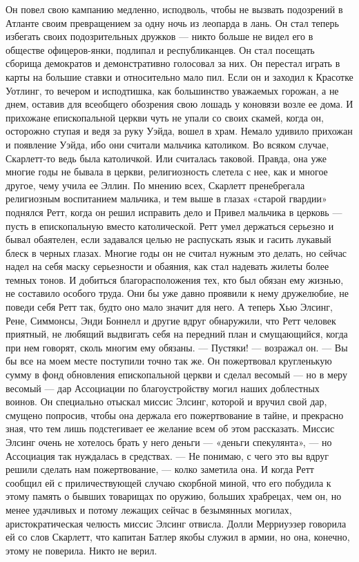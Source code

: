 Он повел свою кампанию медленно, исподволь, чтобы не вызвать подозрений в Атланте своим превращением за одну ночь из леопарда в лань. Он стал теперь избегать своих подозрительных дружков — никто больше не видел его в обществе офицеров-янки, подлипал и республиканцев. Он стал посещать сборища демократов и демонстративно голосовал за них. Он перестал играть в карты на большие ставки и относительно мало пил. Если он и заходил к Красотке Уотлинг, то вечером и исподтишка, как большинство уважаемых горожан, а не днем, оставив для всеобщего обозрения свою лошадь у коновязи возле ее дома.
И прихожане епископальной церкви чуть не упали со своих скамей, когда он, осторожно ступая и ведя за руку Уэйда, вошел в храм. Немало удивило прихожан и появление Уэйда, ибо они считали мальчика католиком. Во всяком случае, Скарлетт-то ведь была католичкой. Или считалась таковой. Правда, она уже многие годы не бывала в церкви, религиозность слетела с нее, как и многое другое, чему учила ее Эллин. По мнению всех, Скарлетт пренебрегала религиозным воспитанием мальчика, и тем выше в глазах «старой гвардии» поднялся Ретт, когда он решил исправить дело и Привел мальчика в церковь — пусть в епископальную вместо католической.
Ретт умел держаться серьезно и бывал обаятелен, если задавался целью не распускать язык и гасить лукавый блеск в черных глазах. Многие годы он не считал нужным это делать, но сейчас надел на себя маску серьезности и обаяния, как стал надевать жилеты более темных тонов. И добиться благорасположения тех, кто был обязан ему жизнью, не составило особого труда. Они бы уже давно проявили к нему дружелюбие, не поведи себя Ретт так, будто оно мало значит для него. А теперь Хью Элсинг, Рене, Симмонсы, Энди Боннелл и другие вдруг обнаружили, что Ретт человек приятный, не любящий выдвигать себя на передний план и смущающийся, когда при нем говорят, сколь многим ему обязаны.
— Пустяки! — возражал он. — Вы бы все на моем месте поступили точно так же.
Он пожертвовал кругленькую сумму в фонд обновления епископальной церкви и сделал весомый — но в меру весомый — дар Ассоциации по благоустройству могил наших доблестных воинов. Он специально отыскал миссис Элсинг, которой и вручил свой дар, смущено попросив, чтобы она держала его пожертвование в тайне, и прекрасно зная, что тем лишь подстегивает ее желание всем об этом рассказать. Миссис Элсинг очень не хотелось брать у него деньги — «деньги спекулянта», — но Ассоциация так нуждалась в средствах.
— Не понимаю, с чего это вы вдруг решили сделать нам пожертвование, — колко заметила она.
И когда Ретт сообщил ей с приличествующей случаю скорбной миной, что его побудила к этому память о бывших товарищах по оружию, больших храбрецах, чем он, но менее удачливых и потому лежащих сейчас в безымянных могилах, аристократическая челюсть миссис Элсинг отвисла. Долли Мерриуэзер говорила ей со слов Скарлетт, что капитан Батлер якобы служил в армии, но она, конечно, этому не поверила. Никто не верил.
